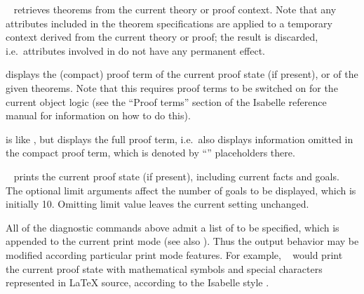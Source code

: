 \begin{isabellebody}
\begin{isamarkuptext}
\begin{description}
  \item \hyperlink{command.thm}{\mbox{}}~ retrieves
  theorems from the current theory or proof context.  Note that any
  attributes included in the theorem specifications are applied to a
  temporary context derived from the current theory or proof; the
  result is discarded, i.e.\ attributes involved in  do not have any permanent effect.

  \item \hyperlink{command.prf}{\mbox{}} displays the (compact) proof term of the
  current proof state (if present), or of the given theorems. Note
  that this requires proof terms to be switched on for the current
  object logic (see the ``Proof terms'' section of the Isabelle
  reference manual for information on how to do this).

  \item \hyperlink{command.full-prf}{\mbox{}} is like \hyperlink{command.prf}{\mbox{}}, but displays
  the full proof term, i.e.\ also displays information omitted in the
  compact proof term, which is denoted by ``'' placeholders
  there.

  \item \hyperlink{command.pr}{\mbox{}}~ prints the current proof state
  (if present), including current facts and goals.  The optional limit
  arguments affect the number of goals to be displayed, which is
  initially 10.  Omitting limit value leaves the current setting
  unchanged.

  \end{description}

  All of the diagnostic commands above admit a list of 
  to be specified, which is appended to the current print mode (see
  also \cite{isabelle-ref}).  Thus the output behavior may be modified
  according particular print mode features.  For example, \hyperlink{command.pr}{\mbox{}}~ would print the current proof state
  with mathematical symbols and special characters represented in
  {\LaTeX} source, according to the Isabelle style
  \cite{isabelle-sys}.


\end{isamarkuptext}
\end{isabellebody}
